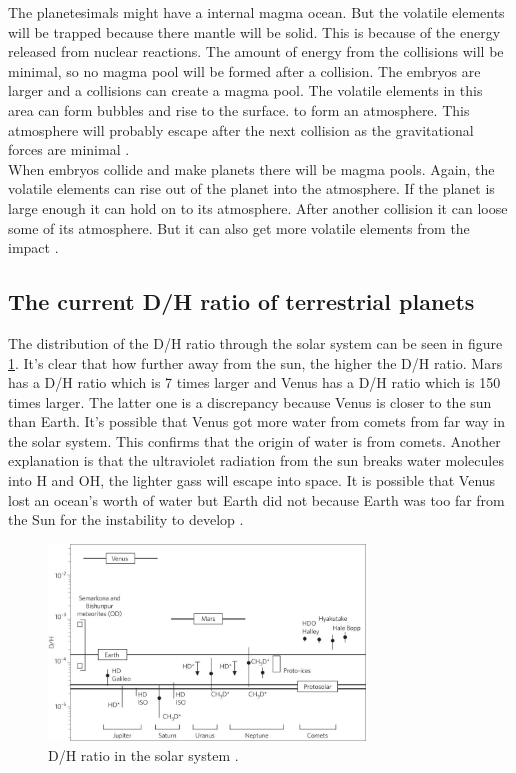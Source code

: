 The planetesimals might have a internal magma ocean. But the volatile elements will be trapped because there mantle will be solid. This is because of the energy released from nuclear reactions. The amount of energy from the collisions will be minimal, so no magma pool will be formed after a collision. The embryos are larger and a collisions can create a magma pool. The volatile elements in this area can form bubbles and rise to the surface. to form an atmosphere. This atmosphere will probably escape after the next collision as the gravitational forces are minimal \cite[p.~118-120]{TPmagma}.\\

When embryos collide and make planets there will be magma pools. Again, the volatile elements can rise out of the planet into the atmosphere. If the planet is large enough it can hold on to its atmosphere. After another collision it can loose some of its atmosphere. But it can also get more volatile elements from the impact \cite[p.~118-120]{TPmagma}. 







\newpage
\subsection{The current D/H ratio of terrestrial planets}
The distribution of the D/H ratio through the solar system can be seen in figure \ref{fig:dh-ratio-terrestrial-planets}. It's clear that how further away from the sun, the higher the D/H ratio. Mars has a D/H ratio which is 7 times larger and Venus has a D/H ratio which is 150 times larger. The latter one is a discrepancy because Venus is closer to the sun than Earth. It's possible that Venus got more water from comets from far way in the solar system. This confirms that the origin of water is from comets. Another explanation is that the ultraviolet radiation from the sun breaks water molecules into H and OH, the lighter gass will escape into space. It is possible that Venus lost an ocean’s worth of water but Earth did not because Earth was too far from the Sun for the instability to develop \cite{TPthreeEras}.

\begin{figure}[H]
	\center
	\includegraphics[width=0.75\textwidth]{figures/dh-ratio-terrestrial-planets.jpg}
	\caption{\label{fig:dh-ratio-terrestrial-planets}D/H ratio in the solar system \cite{TPthreeEras}.}
\end{figure}
